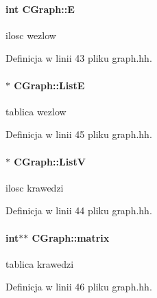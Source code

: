 \paragraph[{E}]{\setlength{\rightskip}{0pt plus 5cm}int C\+Graph\+::\+E\hspace{0.3cm}{\ttfamily [private]}}\label{class_c_graph_a2bd3b0ae57901636d327bc7a6fdab545}
ilosc wezlow 

Definicja w linii 43 pliku graph.\+hh.

\hypertarget{class_c_graph_a76adb49c860f89e14b63fac5b7c6e8d9}{}
\paragraph[{List\+E}]{$\ast$ C\+Graph\+::\+List\+E\hspace{0.3cm}{\ttfamily [private]}}\label{class_c_graph_a76adb49c860f89e14b63fac5b7c6e8d9}
tablica wezlow 

Definicja w linii 45 pliku graph.\+hh.

\hypertarget{class_c_graph_a031ea48f63b03596aa2bb8ee3c3194b4}{}
\paragraph[{List\+V}]{$\ast$ C\+Graph\+::\+List\+V\hspace{0.3cm}{\ttfamily [private]}}\label{class_c_graph_a031ea48f63b03596aa2bb8ee3c3194b4}
ilosc krawedzi 

Definicja w linii 44 pliku graph.\+hh.

\hypertarget{class_c_graph_a53c8f8a69d4d041b8b7557b5fece2f58}{}
\paragraph[{matrix}]{\setlength{\rightskip}{0pt plus 5cm}int$\ast$$\ast$ C\+Graph\+::matrix\hspace{0.3cm}{\ttfamily [private]}}\label{class_c_graph_a53c8f8a69d4d041b8b7557b5fece2f58}
tablica krawedzi 

Definicja w linii 46 pliku graph.\+hh.

\hypertarget{class_c_graph_a76914f22c12c93e293c392342a4a233c}{}
